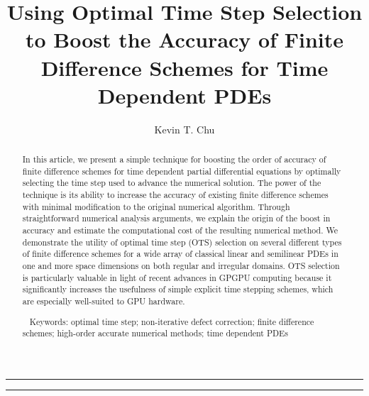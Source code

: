 \documentclass[fleqn,12pt,twoside]{article}
\begin{document}


\title{Using Optimal Time Step Selection to Boost the Accuracy of
       Finite Difference Schemes for Time Dependent PDEs} 

\author{Kevin T. Chu\address{Serendipity Research, Mountain View, CA 94041, United States}
}


\maketitle

\noindent \rule{6.3in}{1pt}

\begin{abstract}
In this article, we present a simple technique for boosting the order of 
accuracy of finite difference schemes for time dependent 
partial differential equations by optimally selecting the time step used
to advance the numerical solution. The power of the technique is its ability
to increase the accuracy of existing finite difference schemes with 
minimal modification to the original numerical algorithm.  Through
straightforward numerical analysis arguments, we explain the origin of the
boost in accuracy and estimate the computational cost of the resulting
numerical method.  We demonstrate the utility of optimal time step (OTS)
selection on several different types of finite difference schemes
for a wide array of classical linear and semilinear PDEs in one and more space
dimensions on both regular and irregular domains.  OTS selection is 
particularly valuable in light of recent advances in GPGPU computing because
it significantly increases the usefulness of simple explicit time stepping
schemes, which are especially well-suited to GPU hardware.

\ \newline
Keywords: optimal time step; non-iterative defect correction; finite difference
schemes; high-order accurate numerical methods; time dependent PDEs

\end{abstract}

\noindent \rule{6.3in}{1pt}
\end{document}
